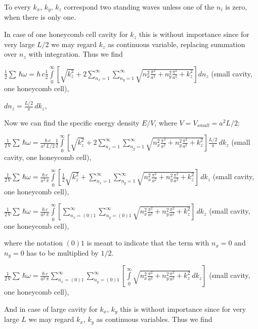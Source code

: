\documentclass[11pt]{article}
\begin{document}
    To every \(k_x\), \(k_y\), \(k_z\) correspond two standing waves unless
one of the \(n_i\) is zero, when there is only one.

    In case of one honeycomb cell cavity for \(k_z\) this is without
importance since for very large \(L/2\) we may regard \(k_z\) as
continuous variable, replacing summation over \(n_z\) with integration.
Thus we find

    \(\frac{1}{2}\sum\,\hbar\omega = \hbar\,c\frac{1}{2}\int\limits_{0}^{\infty}\left[{\sqrt{k_z^2}+2\sum\limits_{n_x=1}^{\infty}\sum\limits_{n_y=1}^{\infty}\sqrt{n_x^2\frac{\pi^2}{a^2}+n_y^2\frac{\pi^2}{a^2}+k_z^2}}\right]d{n_z}\)
(small cavity, one honeycomb cell),

    \(dn_z = \frac{L/2}{\pi}\,dk_z\),

    Now we can find the specific energy density \(E/V\), where
\(V = V_{small} = a^2 L/2\):

    \(\frac{1}{2\,V}\sum\,\hbar\omega = \frac{\hbar\,c}{a^2\,L/2}\frac{1}{2}\int\limits_{0}^{\infty}\left[{\sqrt{k_z^2}+2\sum\limits_{n_x=1}^{\infty}\sum\limits_{n_y=1}^{\infty}\sqrt{n_x^2\frac{\pi^2}{a^2}+n_y^2\frac{\pi^2}{a^2}+k_z^2}}\right]\frac{L/2}{\pi}\,dk_z\)
(small cavity, one honeycomb cell),

    \(\frac{1}{2\,V}\sum\,\hbar\omega = \frac{\hbar\,c}{a^2\,\pi}\int\limits_{0}^{\infty}\left[{\frac{1}{2}\sqrt{k_z^2}+\sum\limits_{n_x=1}^{\infty}\sum\limits_{n_y=1}^{\infty}\sqrt{n_x^2\frac{\pi^2}{a^2}+n_y^2\frac{\pi^2}{a^2}+k_z^2}}\right]\,dk_z\)
(small cavity, one honeycomb cell),

    \(\frac{1}{2\,V}\sum\,\hbar\omega = \frac{\hbar\,c}{a^2\,\pi}\int\limits_{0}^{\infty}\left[{\sum\limits_{n_x=(0)1}^{\infty}\sum\limits_{n_y=(0)1}^{\infty}\sqrt{n_x^2\frac{\pi^2}{a^2}+n_y^2\frac{\pi^2}{a^2}+k_z^2}}\right]\,dk_z\)
(small cavity, one honeycomb cell),

    where the notation \(\left(0\right) 1\) is meant to indicate that the
term with \(n_x = 0\) and \(n_y = 0\) has to be multiplied by
\(1\big/2\).

    \(\frac{1}{2\,V}\sum\,\hbar\omega = \frac{\hbar\,c}{a^2\,\pi}\sum\limits_{n_x=(0)1}^{\infty}\sum\limits_{n_y=(0)1}^{\infty}\left[\int\limits_{0}^{\infty}\sqrt{n_x^2\frac{\pi^2}{a^2}+n_y^2\frac{\pi^2}{a^2}+k_z^2}\,dk_z\right]\)
(small cavity, one honeycomb cell),

    And in case of large cavity for \(k_x\), \(k_y\) this is without
importance since for very large \(L\) we may regard \(k_x\), \(k_y\) as
continuous variables. Thus we find
\end{document}
